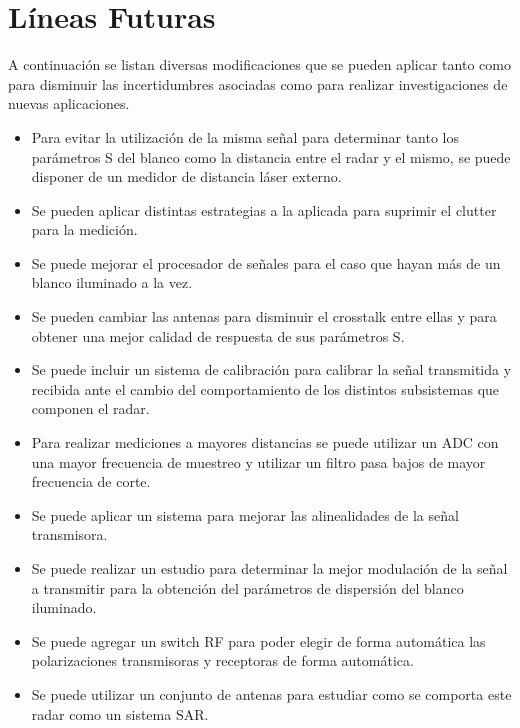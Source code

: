 \chapter{Líneas Futuras} \label{ch:futureWork}

\ifpdf
    \graphicspath{{Chapter6/Figs/Raster/}{Chapter6/Figs/PDF/}{Chapter6/Figs/}}
\else
    \graphicspath{{Chapter6/Figs/Vector/}{Chapter6/Figs/}}
\fi

A continuación se listan diversas modificaciones que se pueden aplicar tanto como para disminuir las incertidumbres asociadas como para realizar investigaciones de nuevas aplicaciones.


\begin{itemize}
    \item Para evitar la utilización de la misma señal para determinar tanto los parámetros S del blanco como la distancia entre el radar y el mismo, se puede disponer de un medidor de distancia láser externo.
    \item Se pueden aplicar distintas estrategias a la aplicada para suprimir el clutter para la medición.
    \item Se puede mejorar el procesador de señales para el caso que hayan más de un blanco iluminado a la vez.
    \item Se pueden cambiar las antenas para disminuir el crosstalk entre ellas y para obtener una mejor calidad de respuesta de sus parámetros S.
    \item Se puede incluir un sistema de calibración para calibrar la señal transmitida y recibida ante el cambio del comportamiento de los distintos subsistemas que componen el radar.
    \item Para realizar mediciones a mayores distancias se puede utilizar un ADC con una mayor frecuencia de muestreo y utilizar un filtro pasa bajos de mayor frecuencia de corte.
    \item Se puede aplicar un sistema para mejorar las alinealidades de la señal transmisora.
    \item Se puede realizar un estudio para determinar la mejor modulación de la señal a transmitir para la obtención del parámetros de dispersión del blanco iluminado.
    \item Se puede agregar un switch RF para poder elegir de forma automática las polarizaciones transmisoras y receptoras de forma automática.
    \item Se puede utilizar un conjunto de antenas para estudiar como se comporta este radar como un sistema SAR.
\end{itemize}
